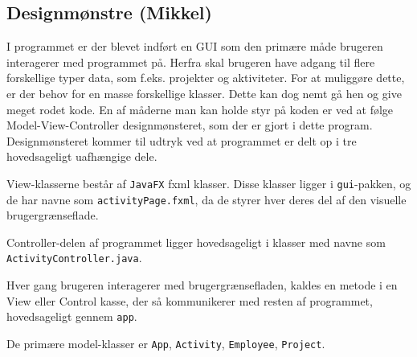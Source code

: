 \subsection{Designmønstre (Mikkel)}

I programmet er der blevet indført en GUI som den primære måde brugeren interagerer med programmet på. Herfra skal brugeren have adgang til flere forskellige typer data, som f.eks. projekter og aktiviteter. For at muliggøre dette, er der behov for en masse forskellige klasser. Dette kan dog nemt gå hen og give meget rodet kode. En af måderne man kan holde styr på koden er ved at følge Model-View-Controller designmønsteret, som der er gjort i dette program. Designmønsteret kommer til udtryk ved at programmet er delt op i tre hovedsageligt uafhængige dele. 

View-klasserne består af \texttt{JavaFX} fxml klasser. Disse klasser ligger i \texttt{gui}-pakken, og de har navne som \texttt{activityPage.fxml}, da de styrer hver deres del af den visuelle brugergrænseflade. 

Controller-delen af programmet ligger hovedsageligt i klasser med navne som \texttt{ActivityController.java}.

Hver gang brugeren interagerer med brugergrænsefladen, kaldes en metode i en View eller Control kasse, der så kommunikerer med resten af programmet, hovedsageligt gennem \texttt{app}.

De primære model-klasser er \texttt{App}, \texttt{Activity}, \texttt{Employee}, \texttt{Project}. 
